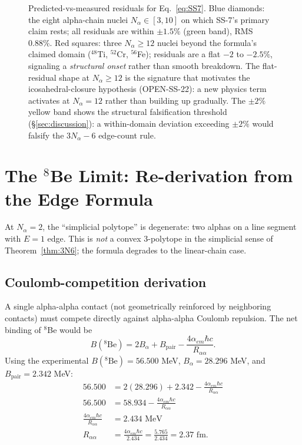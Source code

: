 \documentclass[11pt,letterpaper]{article}
\newcommand{\Bpair}{B_{\mathrm{pair}}}
\newcommand{\Balpha}{B_{\alpha}}
\newcommand{\Nalpha}{N_{\alpha}}
\newcommand{\Raa}{R_{\alpha\alpha}}
\begin{document}
\begin{figure}[H]
\caption{Predicted-vs-measured residuals for Eq.~\ref{eq:SS7}. Blue diamonds: the eight alpha-chain nuclei $\Nalpha \in [3, 10]$ on which SS-7's primary claim rests; all residuals are within $\pm 1.5\%$ (green band), RMS 0.88\%. Red squares: three $\Nalpha \geq 12$ nuclei beyond the formula's claimed domain (${}^{48}$Ti, ${}^{52}$Cr, ${}^{56}$Fe); residuals are a flat $-2$ to $-2.5\%$, signaling a \emph{structural onset} rather than smooth breakdown. The flat-residual shape at $\Nalpha \geq 12$ is the signature that motivates the icosahedral-closure hypothesis (OPEN-SS-22): a new physics term activates at $\Nalpha = 12$ rather than building up gradually. The $\pm 2\%$ yellow band shows the structural falsification threshold (\S\ref{sec:discussion}): a within-domain deviation exceeding $\pm 2\%$ would falsify the $3\Nalpha - 6$ edge-count rule.}
\label{fig:scatter}
\end{figure}

\section{The ${}^8$Be Limit: Re-derivation from the Edge Formula}
\label{sec:8Be_derivation}

At $\Nalpha = 2$, the ``simplicial polytope'' is degenerate: two alphas on a line segment with $E = 1$ edge. This is \emph{not} a convex 3-polytope in the simplicial sense of Theorem~\ref{thm:3N6}; the formula degrades to the linear-chain case.

\subsection{Coulomb-competition derivation}

A single alpha-alpha contact (not geometrically reinforced by neighboring contacts) must compete directly against alpha-alpha Coulomb repulsion. The net binding of ${}^8$Be would be
\[
B({}^8\mathrm{Be}) = 2\Balpha + \Bpair - \frac{4\alpha_{em}\hbar c}{\Raa}.
\]
Using the experimental $B({}^8\mathrm{Be}) = 56.500$ MeV, $\Balpha = 28.296$ MeV, and $\Bpair = 2.342$ MeV:
\begin{align*}
56.500 &= 2(28.296) + 2.342 - \frac{4 \alpha_{em} \hbar c}{\Raa} \\
56.500 &= 58.934 - \frac{4 \alpha_{em} \hbar c}{\Raa} \\
\frac{4 \alpha_{em} \hbar c}{\Raa} &= 2.434 \text{ MeV} \\
\Raa &= \frac{4 \alpha_{em} \hbar c}{2.434} = \frac{5.765}{2.434} = 2.37 \text{ fm}.
\end{align*}
\end{document}
